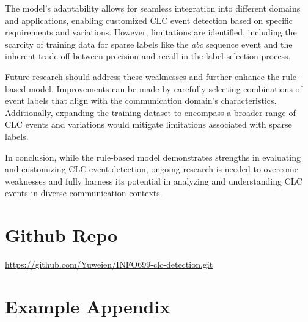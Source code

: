 \documentclass[11pt]{article}
\begin{document}
The model's adaptability allows for seamless integration into different domains and applications, enabling customized CLC event detection based on specific requirements and variations. However, limitations are identified, including the scarcity of training data for sparse labels like the \textit{abc} sequence event and the inherent trade-off between precision and recall in the label selection process.

Future research should address these weaknesses and further enhance the rule-based model. Improvements can be made by carefully selecting combinations of event labels that align with the communication domain's characteristics. Additionally, expanding the training dataset to encompass a broader range of CLC events and variations would mitigate limitations associated with sparse labels.

In conclusion, while the rule-based model demonstrates strengths in evaluating and customizing CLC event detection, ongoing research is needed to overcome weaknesses and fully harness its potential in analyzing and understanding CLC events in diverse communication contexts.

\section*{Github Repo}
\href{https://github.com/Yuweien/INFO699-clc-detection.git}{https://github.com/Yuweien/INFO699-clc-detection.git}




\appendix

\section{Example Appendix}
\label{appendix:label_selection}
\end{document}
